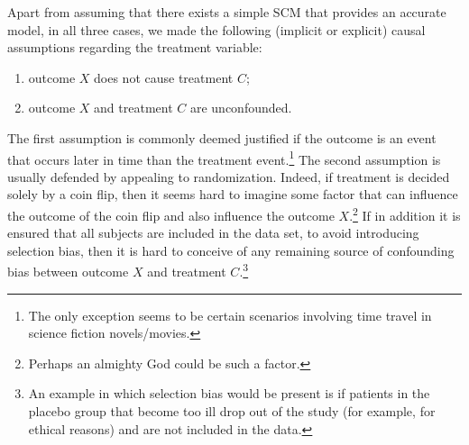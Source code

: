 Apart from assuming that there exists a simple SCM that provides an accurate model,
in all three cases, we made the following (implicit or explicit) causal assumptions regarding 
the treatment variable:
\begin{enumerate}
  \item outcome $X$ does not cause treatment $C$;
  \item outcome $X$ and treatment $C$ are unconfounded.
\end{enumerate}
The first assumption is commonly deemed justified if the outcome is an event that occurs later in time than the treatment event.\footnote{The only exception seems to be certain scenarios involving time travel in science fiction novels/movies.}
The second assumption is usually defended by appealing to randomization.
Indeed, if treatment is decided solely by a coin flip, then it seems hard to imagine some factor that can influence the outcome of the coin flip and also influence the outcome $X$.\footnote{Perhaps an almighty God could be such a factor.}
If in addition it is ensured that all subjects are included in the data set, to avoid introducing selection bias, then it is hard to conceive of any remaining source of confounding bias between outcome $X$ and treatment $C$.\footnote{An example in which selection bias would be present is if patients in the placebo group that become too ill drop out of the study (for example, for ethical reasons) and are not included in the data.}

